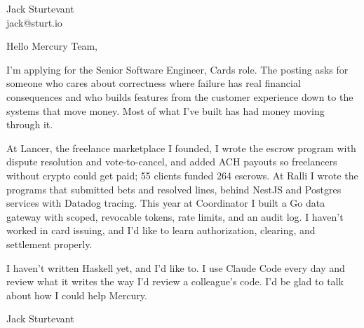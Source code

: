 \documentclass[11pt]{article}
\begin{document}
\raggedright

{\namefont\fontsize{20pt}{24pt}\selectfont Jack Sturtevant}\\[-0.3em]
jack@sturt.io

\vspace{1.2em}

Hello Mercury Team,

I'm applying for the Senior Software Engineer, Cards role. The posting asks for someone who cares about correctness where failure has real financial consequences and who builds features from the customer experience down to the systems that move money. Most of what I've built has had money moving through it.

At Lancer, the freelance marketplace I founded, I wrote the escrow program with dispute resolution and vote-to-cancel, and added ACH payouts so freelancers without crypto could get paid; 55 clients funded 264 escrows. At Ralli I wrote the programs that submitted bets and resolved lines, behind NestJS and Postgres services with Datadog tracing. This year at Coordinator I built a Go data gateway with scoped, revocable tokens, rate limits, and an audit log. I haven't worked in card issuing, and I'd like to learn authorization, clearing, and settlement properly.

I haven't written Haskell yet, and I'd like to. I use Claude Code every day and review what it writes the way I'd review a colleague's code. I'd be glad to talk about how I could help Mercury.

\vspace{0.6em}
Jack Sturtevant
\end{document}
